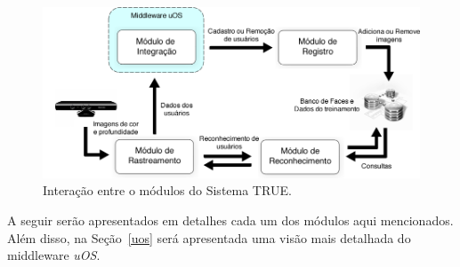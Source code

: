 	\begin{figure}[htb]
			\begin{center}
				\includegraphics[scale=0.5]{figuras/4.ProblemaEProposta/modulo-integracao.png}
			\end{center}
			\caption{Interação entre o módulos do Sistema TRUE.}
			\label{fig:relacao-modulos}
		\end{figure}

A seguir serão apresentados em detalhes cada um dos módulos aqui mencionados. Além disso, na Seção~\ref{uos} será apresentada uma visão mais detalhada do middleware \textit{uOS}.








